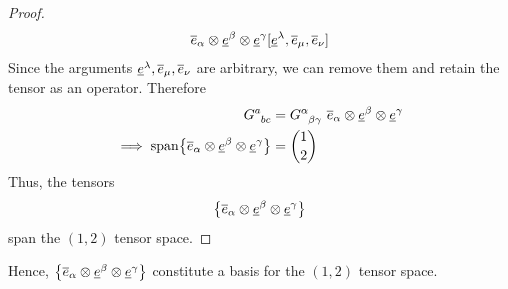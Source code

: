 \begin{solution_pset}
\begin{enumerate}[(1)]
\begin{proof}
\begin{align*}
						\overline{e}_\alpha \otimes \underline{e}^\beta \otimes \underline{e}^\gamma
						[
							\underline{e}^\lambda,
							\overline{e}_\mu,
							\overline{e}_\nu
						]
					\end{align*}
					Since the arguments $
						\underline{e}^\lambda,
						\overline{e}_\mu,
						\overline{e}_\nu
					$ are arbitrary, we can remove them and retain
					the tensor as an operator. Therefore
					\begin{align*}
						G\indices{^a_{bc}} 
						&=
						G\indices{^\alpha_{\beta\gamma}}\ 
						\ovr e_\alpha \otimes \und e^\beta \otimes \und e^\gamma
						\\
						\implies
						\mathrm{span}\qty{
							\ovr e_\alpha \otimes \und e^\beta \otimes \und e^\gamma
						}
						&=
						\binom{1}{2}
					\end{align*}
					Thus, the tensors
					\[
						\qty{
							\overline{e}_\alpha \otimes \underline{e}^\beta \otimes \underline{e}^\gamma
						}
					\]
					span the $(1,2)$ tensor space.
				\end{proof}
		\end{enumerate}
		Hence, $
		\qty{\overline{e}_\alpha \otimes \underline{e}^\beta \otimes \underline{e}^\gamma}
		$ constitute a basis for the $(1,2)$ tensor space.

	\end{solution_pset}
	\newpage
